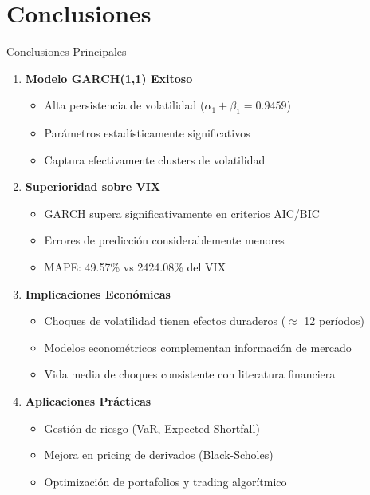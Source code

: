 \section{Conclusiones}

\begin{frame}{Conclusiones Principales}
    \begin{enumerate}
        \item<1-> \textbf{Modelo GARCH(1,1) Exitoso}
        \begin{itemize}
            \item Alta persistencia de volatilidad ($\alpha_1 + \beta_1 = 0.9459$)
            \item Parámetros estadísticamente significativos
            \item Captura efectivamente clusters de volatilidad
        \end{itemize}
        
        \item<2-> \textbf{Superioridad sobre VIX}
        \begin{itemize}
            \item GARCH supera significativamente en criterios AIC/BIC
            \item Errores de predicción considerablemente menores
            \item MAPE: 49.57\% vs 2424.08\% del VIX
        \end{itemize}
        
        \item<3-> \textbf{Implicaciones Económicas}
        \begin{itemize}
            \item Choques de volatilidad tienen efectos duraderos ($\approx$ 12 períodos)
            \item Modelos econométricos complementan información de mercado
            \item Vida media de choques consistente con literatura financiera
        \end{itemize}
        
        \item<4-> \textbf{Aplicaciones Prácticas}
        \begin{itemize}
            \item Gestión de riesgo (VaR, Expected Shortfall)
            \item Mejora en pricing de derivados (Black-Scholes)
            \item Optimización de portafolios y trading algorítmico
        \end{itemize}
    \end{enumerate}
\end{frame}

